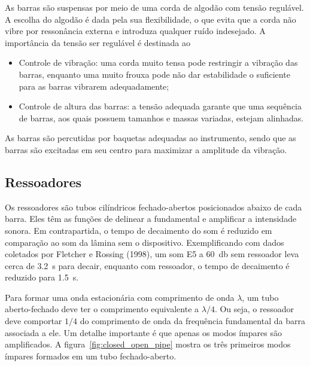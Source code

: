 \documentclass{article}
\begin{document}
As barras são suspensas por meio de uma corda de algodão com tensão regulável. A escolha do algodão é dada pela sua flexibilidade, o que evita que a corda não vibre por ressonância externa e introduza qualquer ruído indesejado. A importância da tensão ser regulável é destinada ao

\begin{itemize}
  \item Controle de vibração: uma corda muito tensa pode restringir a vibração das barras, enquanto uma muito frouxa pode não dar estabilidade o suficiente para as barras vibrarem adequadamente;
  \item Controle de altura das barras: a tensão adequada garante que uma sequência de barras, aos quais possuem tamanhos e massas variadas, estejam alinhadas.
\end{itemize}

As barras são percutidas por baquetas adequadas ao instrumento, sendo que as barras são excitadas em seu centro para maximizar a amplitude da vibração.

\subsection{Ressoadores}

Os ressoadores são tubos cilíndricos fechado-abertos posicionados abaixo de cada barra. Eles têm as funções de delinear a fundamental e amplificar a intensidade sonora. Em contrapartida, o tempo de decaimento do som é reduzido em comparação ao som da lâmina sem o dispositivo. Exemplificando com dados coletados por Fletcher e Rossing (1998), um som E5 a \SI{60}{\decibel} sem ressoador leva cerca de \SI{3.2}{\second} para decair, enquanto com ressoador, o tempo de decaimento é reduzido para \SI{1.5}{\second}.

Para formar uma onda estacionária com comprimento de onda $\lambda$, um tubo aberto-fechado deve ter o comprimento equivalente a $\lambda / 4$. Ou seja, o ressoador deve comportar $1/4$ do comprimento de onda da frequência fundamental da barra associada a ele. {Um detalhe importante é que apenas os modos ímpares são amplificados}\label{modos_impares}. A figura~\ref{fig:closed_open_pipe} mostra os três primeiros modos ímpares formados em um tubo fechado-aberto.
\end{document}
